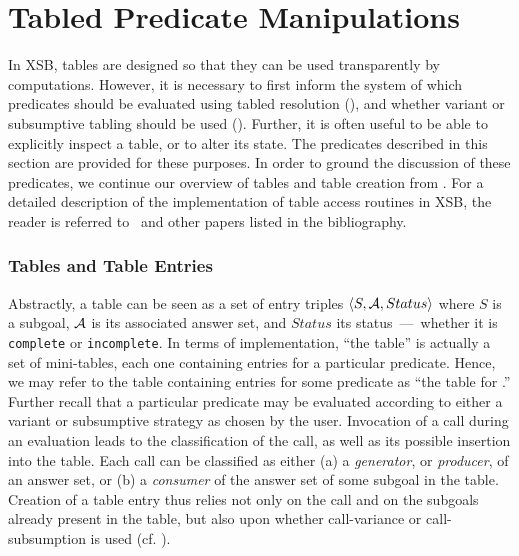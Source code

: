 
\newcommand{\retn}{\code{ret/n}}


\section{Tabled Predicate Manipulations} \label{sec:TablingPredicates}

In XSB, tables are designed so that they can be used transparently by
computations.  However, it is necessary to first inform the system of
which predicates should be evaluated using tabled resolution
(), and whether variant or subsumptive
tabling should be used ().  Further, it
is often useful to be able to explicitly inspect a table, or to alter
its state.  The predicates described in this section are provided for
these purposes.  In order to ground the discussion of these
predicates, we continue our overview of tables and table creation from
.  For a detailed description of the
implementation of table access routines in XSB, the reader is referred
to~\cite{RRSSW98,TST99,CuSW99b} and other papers listed in the
bibliography.


\subsubsection*{Tables and Table Entries}

Abstractly, a table can be seen as a set of entry triples $\langle
S,{\cal A},Status \rangle$ where $S$ is a subgoal, ${\cal A}$ is its associated
answer set, and $Status$ its status~---~whether it is
\texttt{complete} or \texttt{incomplete}.  In terms of implementation,
``the table'' is actually a set of mini-tables, each one containing
entries for a particular predicate.  Hence, we may refer to the table
containing entries for some predicate  as ``the table for
.''  Further recall that a particular predicate may be
evaluated according to either a variant or subsumptive strategy as
chosen by the user.  Invocation of a call during an evaluation leads
to the classification of the call, as well as its possible insertion
into the table.  Each call can be classified as either (a) a
\emph{generator}, or \emph{producer}, of an answer set, or (b) a
\emph{consumer} of the answer set of some subgoal in the table.
Creation of a table entry thus relies not only on the call and on the
subgoals already present in the table, but also upon whether
call-variance or call-subsumption is used (cf. \cite{TST99}).

